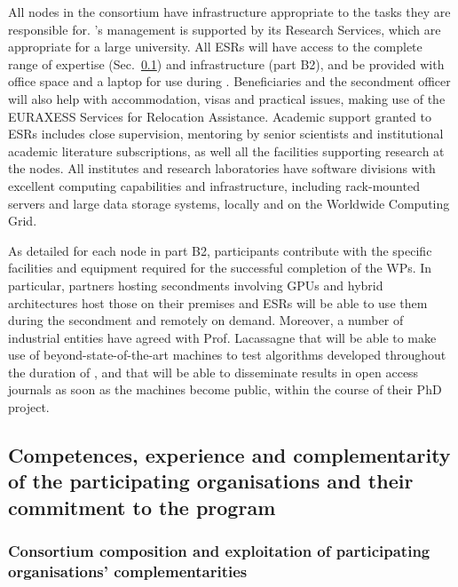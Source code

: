 %
All nodes in the consortium have infrastructure appropriate to the tasks
they are responsible for. \lundentity's management is supported by its Research Services, 
which are appropriate for a large university. 
All ESRs will have access to the complete range of \acronym
expertise (Sec.~\ref{ss:competence_44}) and infrastructure (part B2),
and be provided with office space and a laptop for use during \acronym. 
Beneficiaries and the secondment officer will also help with accommodation,
visas and practical issues, making use of the EURAXESS Services for Relocation Assistance. 
Academic support granted to ESRs includes close supervision, mentoring by senior scientists and 
institutional academic literature subscriptions, as well all the facilities supporting research at the nodes. 
All institutes and research laboratories have software divisions with excellent computing
capabilities and infrastructure, including rack-mounted
servers and large data storage systems, locally and on the Worldwide Computing Grid. 

As detailed for each node in part B2, \acronym participants
contribute with the specific facilities and equipment required for the successful completion of the WPs.
In particular, partners hosting secondments involving GPUs and hybrid architectures host those on their premises
and ESRs will be able to use them during the secondment and remotely on demand. 
Moreover, a number of industrial entities have agreed with Prof. Lacassagne that \ESRg
will be able to make use of beyond-state-of-the-art machines to test algorithms developed
throughout the duration of \acronym, and that \ESRg will
be able to disseminate results in open access journals as soon as
the machines become public, within the course of their PhD project. 

\subsection{Competences, experience and complementarity of the participating organisations and their commitment to the program}
\label{ss:competence_44}

\subsubsection{Consortium composition and exploitation of participating organisations' complementarities}
\label{sub:composition}


